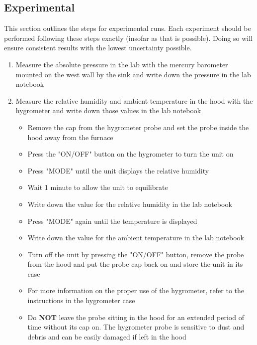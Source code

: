 \documentclass[letterpaper,11pt]{article}
\begin{document}
    \subsection{Experimental}
This section outlines the steps for experimental runs. Each experiment should be
performed following these steps exactly (insofar as that is possible). Doing so
will ensure consistent results with the lowest uncertainty possible.
    \begin{enumerate}
    \item Measure the absolute pressure in the lab with the mercury barometer 
        mounted on the west wall by the sink and write down the pressure
        in the lab notebook
    \item Measure the relative humidity and ambient temperature in the hood  
        with the hygrometer and write down those values in the lab notebook
        \begin{itemize}
        \item Remove the cap from the hygrometer probe and set the probe inside 
            the hood away from the furnace
        \item Press the "ON/OFF" button on the hygrometer to turn the unit on
        \item Press "MODE" until the unit displays the relative humidity
        \item Wait 1 minute to allow the unit to equilibrate
        \item Write down the value for the relative humidity in the lab notebook
        \item Press "MODE" again until the temperature is displayed
        \item Write down the value for the ambient temperature in the lab 
            notebook
        \item Turn off the unit by pressing the "ON/OFF" button, remove the 
            probe from the hood and put the probe cap back on and store the unit
            in its case
        \item For more information on the proper use of the hygrometer, refer to 
            the instructions in the hygrometer case
        \item Do \textbf{NOT} leave the probe sitting in the hood for an 
            extended period of time without its cap on. The hygrometer probe is 
            sensitive to dust and debris and can be easily damaged if left in 
            the hood
        \end{itemize}
        

\end{enumerate}
\end{document}
